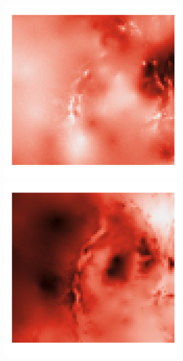 \documentclass{article}
\begin{document}
\begin{figure}
\begin{subfigure}{0.3\textwidth}
 		\includegraphics[width=\linewidth]{figures/p_real3}\\
 		\includegraphics[width=\linewidth]{figures/p_real4}\\

\end{subfigure}
\end{figure}
\end{document}
